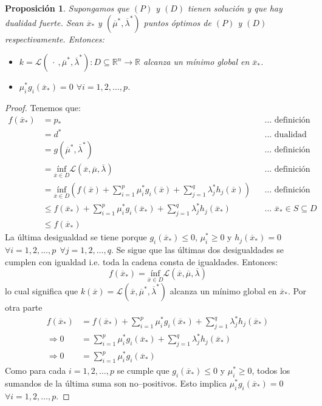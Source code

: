 \documentclass[11pt]{report}
\newtheorem{proposition}{Proposición}[section]
\newcommand{\Rn}{\mathbb{R}^{n}}
\newcommand{\R}{\mathbb{R}}
\newcommand{\mv}{\overline{\mu}}
\newcommand{\lv}{\overline{\lambda}}
\newcommand{\x}{\overline{x}}
\newcommand{\Sp}{1,2,\ldots, p}
\newcommand{\Sq}{1,2,\ldots, q}
\newcommand{\La}{\mathcal{L}}
\newcommand{\po}{p_{*}}
\newcommand{\xo}{\overline{x}_{*}}
\newcommand{\deo}{d^{*}}
\newcommand{\muo}{\overline{\mu}^{*}}
\newcommand{\lao}{\overline{\lambda}^{*}}
\newcommand{\mlo}{(\overline{\mu}^{*},\overline{\lambda}^{*})}
\begin{document}
\begin{proposition}
Supongamos que $(P)$ y $(D)$ tienen solución y que hay dualidad fuerte. Sean $\xo$ y $\mlo$ puntos óptimos de $(P)$ y $(D)$ respectivamente. Entonces:
\begin{itemize}
\item[(i)] $k=\La(\ \cdot\ ,\muo, \lao):D\subseteq\Rn\rightarrow\R$ alcanza un mínimo global en $\xo$.
\item[(ii)] $\mu_{i}^{*}g_{i}(\xo)=0$ $\forall i=\Sp$.
\end{itemize}
\end{proposition}
\begin{proof}
Tenemos que:
\begin{equation*}
\begin{aligned}
f(\xo)&=\po &&\text{... definición}\\
&=\deo &&\text{... dualidad fuerte}\\
&=g(\muo,\lao) &&\text{... definición}\\
&=\underset{\x\in D}{\text{ínf}}\La(\x,\mv,\lv) &&\text{... definición}\\
&=\underset{\x\in D}{\text{ínf}} \left( f(\x)+\sum_{i=1}^{p}\mu_{i}^{*} g_{i}(\x) + \sum_{j=1}^{q}\lambda_{j}^{*} h_{j}(\x) \right) &&\text{... definición}\\
&\leq f(\xo)+\sum_{i=1}^{p}\mu_{i}^{*} g_{i}(\xo) + \sum_{j=1}^{q}\lambda_{j}^{*} h_{j}(\xo) &&\text{... $\xo\in S\subseteq D$}\\
&\leq f(\xo)
\end{aligned}
\end{equation*}
La última desigualdad se tiene porque $g_{i}(\xo)\leq0$, $\mu_{i}^{*}\geq0$ y $h_{j}(\xo)=0$ $\forall i=\Sp\ \ \forall j=\Sq$. Se sigue que las últimas dos desigualdades se cumplen con igualdad i.e. toda la cadena consta de igualdades. Entonces:
$$f(\xo)=\underset{\x\in D}{\text{ínf}}\La(\x,\mv,\lv)$$
lo cual significa que $k(\x)=\La(\x,\muo, \lao)$ alcanza un mínimo global en $\xo$.
Por otra parte
\begin{equation*}
\begin{aligned}
f(\xo)&=f(\xo)+\sum_{i=1}^{p}\mu_{i}^{*} g_{i}(\xo) + \sum_{j=1}^{q}\lambda_{j}^{*} h_{j}(\xo)\\
\Rightarrow 0&=\sum_{i=1}^{p}\mu_{i}^{*} g_{i}(\xo) + \sum_{j=1}^{q}\lambda_{j}^{*} h_{j}(\xo)\\
\Rightarrow 0&=\sum_{i=1}^{p}\mu_{i}^{*} g_{i}(\xo)
\end{aligned}
\end{equation*}
Como para cada $i=\Sp$ se cumple que $g_{i}(\xo)\leq0$ y $\mu_{i}^{*}\geq0$, todos los sumandos de la última suma son no--positivos. Esto implica $\mu_{i}^{*}g_{i}(\xo)=0$ $\forall i=\Sp$.
\end{proof}
\end{document}
